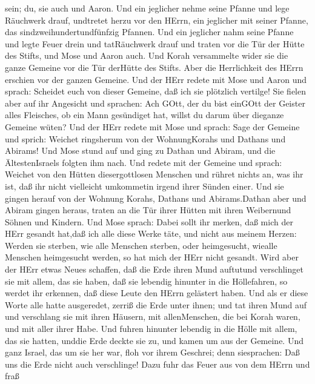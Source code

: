 sein; du, sie auch und Aaron.  Und ein jeglicher nehme
seine Pfanne und lege Räuchwerk drauf, undtretet herzu vor den HErrn,
ein jeglicher mit seiner Pfanne, das sindzweihundertundfünfzig Pfannen.
 Und ein jeglicher nahm seine Pfanne und legte Feuer drein
und tatRäuchwerk drauf und traten vor die Tür der Hütte des Stifts, und
Mose und Aaron auch.  Und Korah versammelte wider sie die
ganze Gemeine vor die Tür derHütte des Stifts. Aber die Herrlichkeit des
HErrn erschien vor der ganzen Gemeine.  Und der HErr redete
mit Mose und Aaron und sprach:  Scheidet euch von dieser
Gemeine, daß ich sie plötzlich vertilge!  Sie fielen aber
auf ihr Angesicht und sprachen: Ach GOtt, der du bist einGOtt der
Geister alles Fleisches, ob ein Mann gesündiget hat, willst du darum
über dieganze Gemeine wüten?  Und der HErr redete mit Mose
und sprach:  Sage der Gemeine und sprich: Weichet
ringsherum von der WohnungKorahs und Dathans und Abirams! 
Und Mose stund auf und ging zu Dathan und Abiram, und die
ÄltestenIsraels folgten ihm nach.  Und redete mit der
Gemeine und sprach: Weichet von den Hütten diesergottlosen Menschen und
rühret nichts an, was ihr ist, daß ihr nicht vielleicht umkommetin
irgend ihrer Sünden einer.  Und sie gingen herauf von der
Wohnung Korahs, Dathans und Abirams.Dathan aber und Abiram gingen
heraus, traten an die Tür ihrer Hütten mit ihren Weibernund Söhnen und
Kindern.  Und Mose sprach: Dabei sollt ihr merken, daß mich
der HErr gesandt hat,daß ich alle diese Werke täte, und nicht aus meinem
Herzen:  Werden sie sterben, wie alle Menschen sterben,
oder heimgesucht, wiealle Menschen heimgesucht werden, so hat mich der
HErr nicht gesandt.  Wird aber der HErr etwas Neues
schaffen, daß die Erde ihren Mund auftutund verschlinget sie mit allem,
das sie haben, daß sie lebendig hinunter in die Höllefahren, so werdet
ihr erkennen, daß diese Leute den HErrn gelästert haben. 
Und als er diese Worte alle hatte ausgeredet, zerriß die Erde unter
ihnen;  und tat ihren Mund auf und verschlang sie mit ihren
Häusern, mit allenMenschen, die bei Korah waren, und mit aller ihrer
Habe.  Und fuhren hinunter lebendig in die Hölle mit allem,
das sie hatten, unddie Erde deckte sie zu, und kamen um aus der Gemeine.
 Und ganz Israel, das um sie her war, floh vor ihrem
Geschrei; denn siesprachen: Daß uns die Erde nicht auch verschlinge!
 Dazu fuhr das Feuer aus von dem HErrn und fraß

